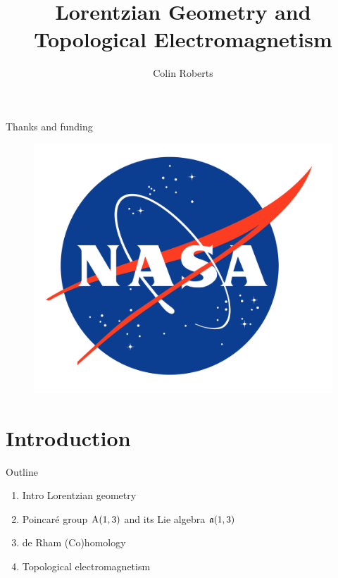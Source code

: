 \documentclass[UKenglish]{beamer}
\title{Lorentzian Geometry and Topological Electromagnetism}
\author{Colin Roberts}
\begin{document}

\begin{frame}{}
    Thanks and funding
    \begin{figure}[h]
    \includegraphics[scale=.05]{figures/NASA_logo.png}
    \end{figure}
\end{frame}


\section{Introduction}



\begin{frame}{Outline}
\vfill
\begin{enumerate}
    \item Intro Lorentzian geometry
    \item Poincar\'e group $\operatorname{A}(1,3)$ and its Lie algebra $\mathfrak{a}(1,3)$
    \item de Rham (Co)homology
    \item Topological electromagnetism
\end{enumerate}
\vfill
\end{frame}
\end{document}
